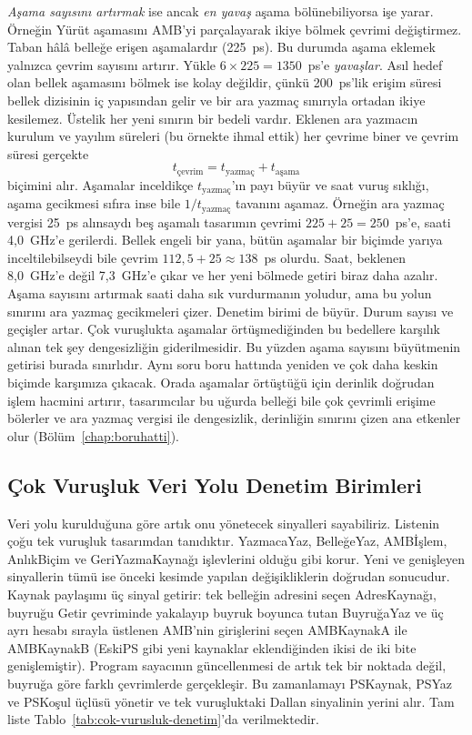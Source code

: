 \emph{Aşama sayısını artırmak} ise ancak \emph{en yavaş} aşama bölünebiliyorsa işe yarar. Örneğin Yürüt aşamasını AMB'yi parçalayarak ikiye bölmek çevrimi değiştirmez. Taban hâlâ belleğe erişen aşamalardır (225~ps). Bu durumda aşama eklemek yalnızca çevrim sayısını artırır. Yükle $6 \times 225 = 1350$~ps'e \emph{yavaşlar}. Asıl hedef olan bellek aşamasını bölmek ise kolay değildir, çünkü 200~ps'lik erişim süresi bellek dizisinin iç yapısından gelir ve bir ara yazmaç sınırıyla ortadan ikiye kesilemez. Üstelik her yeni sınırın bir bedeli vardır. Eklenen ara yazmacın kurulum ve yayılım süreleri (bu örnekte ihmal ettik) her çevrime biner ve çevrim süresi gerçekte
\[
t_{\text{çevrim}} = t_{\text{yazmaç}} + t_{\text{aşama}}
\]
biçimini alır. Aşamalar inceldikçe $t_{\text{yazmaç}}$'ın payı büyür ve saat vuruş sıklığı, aşama gecikmesi sıfıra inse bile $1/t_{\text{yazmaç}}$ tavanını aşamaz. Örneğin ara yazmaç vergisi 25~ps alınsaydı beş aşamalı tasarımın çevrimi $225+25 = 250$~ps'e, saati 4{,}0~GHz'e gerilerdi. Bellek engeli bir yana, bütün aşamalar bir biçimde yarıya inceltilebilseydi bile çevrim $112{,}5 + 25 \approx 138$~ps olurdu. Saat, beklenen 8{,}0~GHz'e değil 7{,}3~GHz'e çıkar ve her yeni bölmede getiri biraz daha azalır. Aşama sayısını artırmak saati daha sık vurdurmanın yoludur, ama bu yolun sınırını ara yazmaç gecikmeleri çizer. Denetim birimi de büyür. Durum sayısı ve geçişler artar. Çok vuruşlukta aşamalar örtüşmediğinden bu bedellere karşılık alınan tek şey dengesizliğin giderilmesidir. Bu yüzden aşama sayısını büyütmenin getirisi burada sınırlıdır. Aynı soru boru hattında yeniden ve çok daha keskin biçimde karşımıza çıkacak. Orada aşamalar örtüştüğü için derinlik doğrudan işlem hacmini artırır, tasarımcılar bu uğurda belleği bile çok çevrimli erişime bölerler ve ara yazmaç vergisi ile dengesizlik, derinliğin sınırını çizen ana etkenler olur (Bölüm~\ref{chap:boruhatti}).

\subsection{Çok Vuruşluk Veri Yolu Denetim Birimleri}
\label{subsec:cok-vurusluk-denetim}

Veri yolu kurulduğuna göre artık onu yönetecek sinyalleri sayabiliriz. Listenin çoğu tek vuruşluk tasarımdan tanıdıktır. YazmacaYaz, BelleğeYaz, AMBİşlem, AnlıkBiçim ve GeriYazmaKaynağı işlevlerini olduğu gibi korur. Yeni ve genişleyen sinyallerin tümü ise önceki kesimde yapılan değişikliklerin doğrudan sonucudur. Kaynak paylaşımı üç sinyal getirir: tek belleğin adresini seçen AdresKaynağı, buyruğu Getir çevriminde yakalayıp buyruk boyunca tutan BuyruğaYaz ve üç ayrı hesabı sırayla üstlenen AMB'nin girişlerini seçen AMBKaynakA ile AMBKaynakB (EskiPS gibi yeni kaynaklar eklendiğinden ikisi de iki bite genişlemiştir). Program sayacının güncellenmesi de artık tek bir noktada değil, buyruğa göre farklı çevrimlerde gerçekleşir. Bu zamanlamayı PSKaynak, PSYaz ve PSKoşul üçlüsü yönetir ve tek vuruşluktaki Dallan sinyalinin yerini alır. Tam liste Tablo~\ref{tab:cok-vurusluk-denetim}'da verilmektedir.

